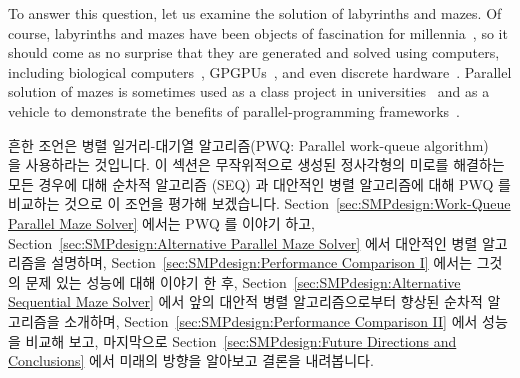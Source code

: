 To answer this question, let us examine the solution of
labyrinths and mazes.
Of course, labyrinths and mazes have been objects of fascination for
millennia~\cite{WikipediaLabyrinth},
so it should come as no surprise that they are generated and solved
using computers, including biological
computers~\cite{AndrewAdamatzky2011SlimeMold},
GPGPUs~\cite{ChristerEricson2008GPUMaze}, and even
discrete hardware~\cite{MIT:TRMag:MemristorMazes}.
Parallel solution of mazes is sometimes used as a class project in
universities~\cite{ETHZurich:FS2011maze,UMD:CMSC433maze} and
as a vehicle to demonstrate the benefits of parallel-programming
frameworks~\cite{RonFosner2010maze}.
\fi

흔한 조언은 병렬 일거리-대기열 알고리즘(PWQ: Parallel work-queue
algorithm)~\cite{ETHZurich:FS2011maze,RonFosner2010maze} 을 사용하라는
것입니다.
이 섹션은 무작위적으로 생성된 정사각형의 미로를 해결하는 모든 경우에 대해
순차적 알고리즘 (SEQ) 과 대안적인 병렬 알고리즘에 대해 PWQ 를 비교하는 것으로
이 조언을 평가해 보겠습니다.
Section~\ref{sec:SMPdesign:Work-Queue Parallel Maze Solver} 에서는 PWQ 를
이야기 하고,
Section~\ref{sec:SMPdesign:Alternative Parallel Maze Solver} 에서 대안적인 병렬
알고리즘을 설명하며,
Section~\ref{sec:SMPdesign:Performance Comparison I} 에서는 그것의 문제 있는
성능에 대해 이야기 한 후,
Section~\ref{sec:SMPdesign:Alternative Sequential Maze Solver} 에서 앞의 대안적
병렬 알고리즘으로부터 향상된 순차적 알고리즘을 소개하며,
Section~\ref{sec:SMPdesign:Performance Comparison II} 에서 성능을 비교해 보고,
마지막으로
Section~\ref{sec:SMPdesign:Future Directions and Conclusions} 에서 미래의
방향을 알아보고 결론을 내려봅니다.

